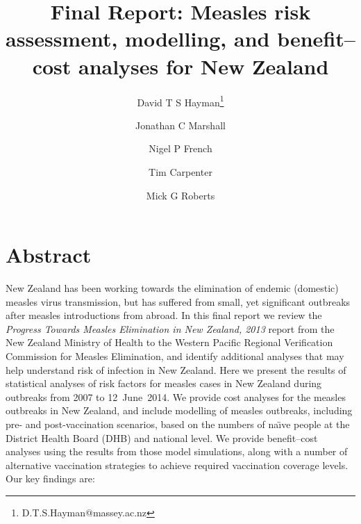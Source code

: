 \documentclass{article}
\begin{document}


\title{Final Report: Measles risk assessment, modelling, and benefit--cost analyses for New Zealand}
\author[1]{David T S Hayman\thanks{D.T.S.Hayman@massey.ac.nz}}
\author[1] {Jonathan C Marshall}
\author[1] {Nigel P French}
\author[2] {Tim Carpenter}
\author[3] {Mick G Roberts}
\date{}
\maketitle

\tableofcontents

%  

\section{Abstract}

New Zealand has been working towards the elimination of endemic (domestic) measles virus transmission, but has suffered from small, yet significant outbreaks after measles introductions from abroad. In this final report we review the \emph {Progress Towards Measles Elimination in New Zealand, 2013} report from the New Zealand Ministry of Health to the Western Pacific Regional Verification Commission for Measles Elimination, and identify additional analyses that may help understand risk of infection in New Zealand. Here we present the results of statistical analyses of risk factors for measles cases in New Zealand during outbreaks from 2007 to 12~June~2014. We provide cost analyses for the measles outbreaks in New Zealand, and include modelling of measles outbreaks, including pre- and post-vaccination scenarios, based on the numbers of na\"{\i}ve people at the District Health Board (DHB) and national level. We provide benefit--cost analyses using the results from those model simulations, along with a number of alternative vaccination strategies to achieve required vaccination coverage levels. Our key findings are:
\end{document}
